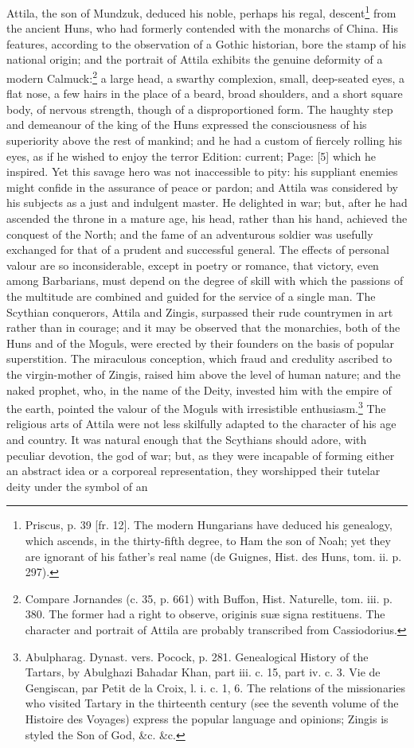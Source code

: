 Attila, the son of Mundzuk, deduced his noble, perhaps his regal, descent\footnote{Priscus, p. 39 [fr. 12]. The modern Hungarians have deduced his genealogy, which ascends, in the thirty-fifth degree, to Ham the son of Noah; yet they are ignorant of his father\texthebrew{}’s real name (de Guignes, Hist. des Huns, tom. ii. p. 297).} from the ancient Huns, who had formerly contended with the monarchs of China. His features, according to the observation of a Gothic historian, bore the stamp of his national origin; and the portrait of Attila exhibits the genuine deformity of a modern Calmuck:\footnote{Compare Jornandes (c. 35, p. 661) with Buffon, Hist. Naturelle, tom. iii. p. 380. The former had a right to observe, originis suæ signa restituens. The character and portrait of Attila are probably transcribed from Cassiodorius.} a large head, a swarthy complexion, small, deep-seated eyes, a flat nose, a few hairs in the place of a beard, broad shoulders, and a short square body, of nervous strength, though of a disproportioned form. The haughty step and demeanour of the king of the Huns expressed the consciousness of his superiority above the rest of mankind; and he had a custom of fiercely rolling his eyes, as if he wished to enjoy the terror Edition: current; Page: [5] which he inspired. Yet this savage hero was not inaccessible to pity: his suppliant enemies might confide in the assurance of peace or pardon; and Attila was considered by his subjects as a just and indulgent master. He delighted in war; but, after he had ascended the throne in a mature age, his head, rather than his hand, achieved the conquest of the North; and the fame of an adventurous soldier was usefully exchanged for that of a prudent and successful general. The effects of personal valour are so inconsiderable, except in poetry or romance, that victory, even among Barbarians, must depend on the degree of skill with which the passions of the multitude are combined and guided for the service of a single man. The Scythian conquerors, Attila and Zingis, surpassed their rude countrymen in art rather than in courage; and it may be observed that the monarchies, both of the Huns and of the Moguls, were erected by their founders on the basis of popular superstition. The miraculous conception, which fraud and credulity ascribed to the virgin-mother of Zingis, raised him above the level of human nature; and the naked prophet, who, in the name of the Deity, invested him with the empire of the earth, pointed the valour of the Moguls with irresistible enthusiasm.\footnote{Abulpharag. Dynast. vers. Pocock, p. 281. Genealogical History of the Tartars, by Abulghazi Bahadar Khan, part iii. c. 15, part iv. c. 3. Vie de Gengiscan, par Petit de la Croix, l. i. c. 1, 6. The relations of the missionaries who visited Tartary in the thirteenth century (see the seventh volume of the Histoire des Voyages) express the popular language and opinions; Zingis is styled the Son of God, \&c. \&c.} The religious arts of Attila were not less skilfully adapted to the character of his age and country. It was natural enough that the Scythians should adore, with peculiar devotion, the god of war; but, as they were incapable of forming either an abstract idea or a corporeal representation, they worshipped their tutelar deity under the symbol of an 